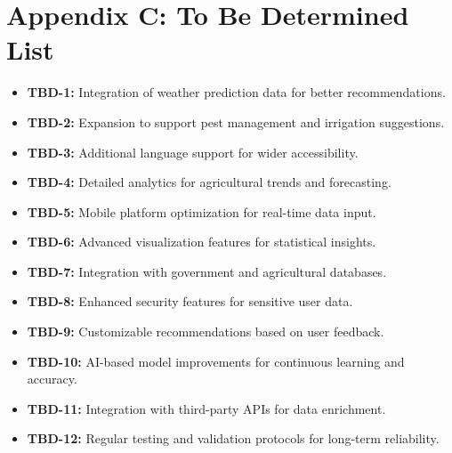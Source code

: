 \documentclass{scrreprt}
\begin{document}
\chapter{Appendix C: To Be Determined List}
\begin{itemize}
    \item \textbf{TBD-1:} Integration of weather prediction data for better recommendations.
    \item \textbf{TBD-2:} Expansion to support pest management and irrigation suggestions.
    \item \textbf{TBD-3:} Additional language support for wider accessibility.
    \item \textbf{TBD-4:} Detailed analytics for agricultural trends and forecasting.
    \item \textbf{TBD-5:} Mobile platform optimization for real-time data input.
    \item \textbf{TBD-6:} Advanced visualization features for statistical insights.
    \item \textbf{TBD-7:} Integration with government and agricultural databases.
    \item \textbf{TBD-8:} Enhanced security features for sensitive user data.
    \item \textbf{TBD-9:} Customizable recommendations based on user feedback.
    \item \textbf{TBD-10:} AI-based model improvements for continuous learning and accuracy.
    \item \textbf{TBD-11:} Integration with third-party APIs for data enrichment.
    \item \textbf{TBD-12:} Regular testing and validation protocols for long-term reliability.
\end{itemize}
\end{document}
